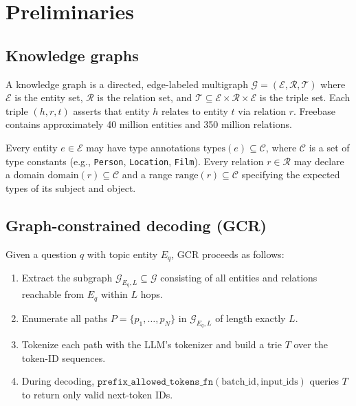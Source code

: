 \documentclass[11pt,twoside]{article}
\begin{document}
\section{Preliminaries}
\label{sec:prelim}

\subsection{Knowledge graphs}

A knowledge graph is a directed, edge-labeled multigraph \(\mathcal{G} = (\mathcal{E}, \mathcal{R}, \mathcal{T})\) where \(\mathcal{E}\) is the entity set, \(\mathcal{R}\) is the relation set, and \(\mathcal{T} \subseteq \mathcal{E} \times \mathcal{R} \times \mathcal{E}\) is the triple set. Each triple \((h, r, t)\) asserts that entity \(h\) relates to entity \(t\) via relation \(r\). Freebase~\citep{bollacker2008freebase} contains approximately 40 million entities and 350 million relations.

Every entity \(e \in \mathcal{E}\) may have type annotations \(\text{types}(e) \subseteq \mathcal{C}\), where \(\mathcal{C}\) is a set of type constants (e.g., \texttt{Person}, \texttt{Location}, \texttt{Film}). Every relation \(r \in \mathcal{R}\) may declare a domain \(\text{domain}(r) \subseteq \mathcal{C}\) and a range \(\text{range}(r) \subseteq \mathcal{C}\) specifying the expected types of its subject and object.

\subsection{Graph-constrained decoding (GCR)}

Given a question \(q\) with topic entity \(E_q\), GCR proceeds as follows:

\begin{enumerate}
	\item Extract the subgraph \(\mathcal{G}_{E_q, L} \subseteq \mathcal{G}\) consisting of all entities and relations reachable from \(E_q\) within \(L\) hops.
	\item Enumerate all paths \(P = \{p_1, \dots, p_N\}\) in \(\mathcal{G}_{E_q, L}\) of length exactly \(L\).
	\item Tokenize each path with the LLM's tokenizer and build a trie \(T\) over the token-ID sequences.
	\item During decoding, \(\texttt{prefix\_allowed\_tokens\_fn}(\text{batch\_id}, \text{input\_ids})\) queries \(T\) to return only valid next-token IDs.
\end{enumerate}
\end{document}
